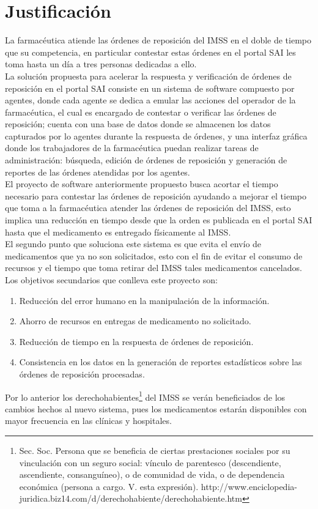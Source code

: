 \documentclass[a4paper,10pt]{article}
\begin{document}
\section{Justificación}
La farmacéutica atiende las órdenes de reposición del IMSS en el doble de tiempo que su competencia, en particular contestar estas órdenes en el portal SAI les toma hasta un día a tres personas dedicadas a ello.\\
La solución propuesta para acelerar la respuesta y verificación de órdenes de reposición en el portal SAI consiste en un sistema de software compuesto por agentes, donde cada agente se dedica a emular las acciones del operador de la farmacéutica, el cual es encargado de contestar o verificar las órdenes de reposición; cuenta con una base de datos donde se almacenen los datos capturados por lo agentes durante la respuesta de órdenes, y una interfaz gráfica donde los trabajadores de la farmacéutica puedan realizar tareas de administración: búsqueda, edición de órdenes de reposición y  generación de reportes de las órdenes atendidas por los agentes.\\
El proyecto de software anteriormente propuesto busca acortar el tiempo necesario para contestar las órdenes de reposición ayudando a mejorar el tiempo que toma a la farmacéutica atender las órdenes de reposición del IMSS, esto implica una reducción en tiempo desde que la orden es publicada en el portal SAI hasta que el medicamento es entregado físicamente al IMSS.\\
El segundo punto que soluciona este sistema es que evita el envío de medicamentos que ya no son solicitados, esto con el fin de evitar el consumo de recursos y el tiempo que toma retirar del IMSS tales medicamentos cancelados.\\
Los objetivos secundarios que conlleva este proyecto son:
\begin{enumerate}
\item Reducción del error humano en la manipulación de la información. 
\item Ahorro de recursos en entregas de medicamento no solicitado. 
\item Reducción de tiempo en la respuesta de órdenes de reposición.
\item Consistencia en los datos en la generación de reportes estadísticos sobre las órdenes de reposición procesadas.
\end{enumerate}
Por lo anterior los derechohabientes\footnote{Sec. Soc. Persona que se beneficia de ciertas prestaciones sociales por su vinculación con un seguro social: vínculo de parentesco (descendiente, ascendiente, consanguíneo), o de comunidad de vida, o de dependencia económica (persona a cargo. V. esta expresión).  http://www.enciclopedia-juridica.biz14.com/d/derechohabiente/derechohabiente.htm} del IMSS se verán beneficiados de los cambios hechos al nuevo sistema, pues los medicamentos estarán disponibles con mayor frecuencia en las clínicas y hospitales.
\end{document}
